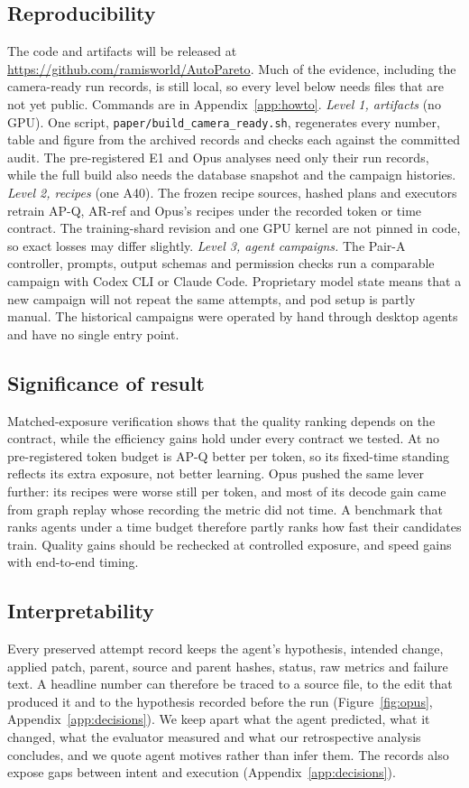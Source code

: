\documentclass{article}
\newif\ifshowhumanmarkers \showhumanmarkersfalse
\newcommand{\humantag}[1]{{\color{humanframe}\sffamily\scriptsize\bfseries HUMAN AUTHOR MUST REWRITE/VERIFY [#1]}\ }
\newcommand{\humanauthor}[2][]{\ifshowhumanmarkers\begin{humanbox}\humantag{#1}#2\end{humanbox}\else #2\par\fi}
\begin{document}
\subsection{Reproducibility}\label{sec:reproduce}
\humanauthor[P2-17 r6]{The code and artifacts will be released at \url{https://github.com/ramisworld/AutoPareto}. Much of the evidence, including the camera-ready run records, is still local, so every level below needs files that are not yet public. Commands are in Appendix~\ref{app:howto}. \emph{Level 1, artifacts} (no GPU). One script, \texttt{paper/build\_camera\_ready.sh}, regenerates every number, table and figure from the archived records and checks each against the committed audit. The pre-registered E1 and Opus analyses need only their run records, while the full build also needs the database snapshot and the campaign histories. \emph{Level 2, recipes} (one A40). The frozen recipe sources, hashed plans and executors retrain AP-Q, AR-ref and Opus's recipes under the recorded token or time contract. The training-shard revision and one GPU kernel are not pinned in code, so exact losses may differ slightly. \emph{Level 3, agent campaigns.} The Pair-A controller, prompts, output schemas and permission checks run a comparable campaign with Codex CLI or Claude Code. Proprietary model state means that a new campaign will not repeat the same attempts, and pod setup is partly manual. The historical campaigns were operated by hand through desktop agents and have no single entry point.}

\subsection{Significance of result}
\humanauthor[P2-12 r6]{Matched-exposure verification shows that the quality ranking depends on the contract, while the efficiency gains hold under every contract we tested. At no pre-registered token budget is AP-Q better per token, so its fixed-time standing reflects its extra exposure, not better learning. Opus pushed the same lever further: its recipes were worse still per token, and most of its decode gain came from graph replay whose recording the metric did not time. A benchmark that ranks agents under a time budget therefore partly ranks how fast their candidates train. Quality gains should be rechecked at controlled exposure, and speed gains with end-to-end timing.}

\subsection{Interpretability}
\humanauthor[P2-13 r6]{Every preserved attempt record keeps the agent's hypothesis, intended change, applied patch, parent, source and parent hashes, status, raw metrics and failure text. A headline number can therefore be traced to a source file, to the edit that produced it and to the hypothesis recorded before the run (Figure~\ref{fig:opus}, Appendix~\ref{app:decisions}). We keep apart what the agent predicted, what it changed, what the evaluator measured and what our retrospective analysis concludes, and we quote agent motives rather than infer them. The records also expose gaps between intent and execution (Appendix~\ref{app:decisions}).}
\end{document}

